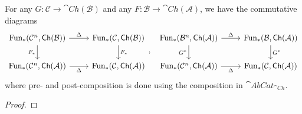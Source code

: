 \begin{lem}[label=lem:B.8]
    For any $G:\mathcal{C}\to \cat{Ch}(\mathcal{B})$ and any $F:\mathcal{B}\to \cat{Ch}(\mathcal{A})$, we have the commutative diagrams
    \begin{equation*}
        \begin{tikzcd}
            {\text{Fun}_*(\mathcal{C}^n,\cat{Ch}(\mathcal{B}))} & {\text{Fun}_*(\mathcal{C},\cat{Ch}(\mathcal{B}))} \\
            {\text{Fun}_*(\mathcal{C}^n,\cat{Ch}(\mathcal{A}))} & {\text{Fun}_*(\mathcal{C},\cat{Ch}(\mathcal{A}))}
            \arrow["\Delta", from=1-1, to=1-2]
            \arrow["{F_*}"', from=1-1, to=2-1]
            \arrow["{F_*}", from=1-2, to=2-2]
            \arrow["\Delta"', from=2-1, to=2-2]
        \end{tikzcd},\;\;\begin{tikzcd}
            {\text{Fun}_*(\mathcal{B}^n,\cat{Ch}(\mathcal{A}))} & {\text{Fun}_*(\mathcal{B},\cat{Ch}(\mathcal{A}))} \\
            {\text{Fun}_*(\mathcal{C}^n,\cat{Ch}(\mathcal{A}))} & {\text{Fun}_*(\mathcal{C},\cat{Ch}(\mathcal{A}))}
            \arrow["\Delta", from=1-1, to=1-2]
            \arrow["{G^*}"', from=1-1, to=2-1]
            \arrow["{G^*}", from=1-2, to=2-2]
            \arrow["\Delta"', from=2-1, to=2-2]
        \end{tikzcd}
    \end{equation*}
    where pre- and post-composition is done using the composition in $\cat{AbCat}_{\cat{Ch}}$.
\end{lem}
\begin{proof}
    
\end{proof}